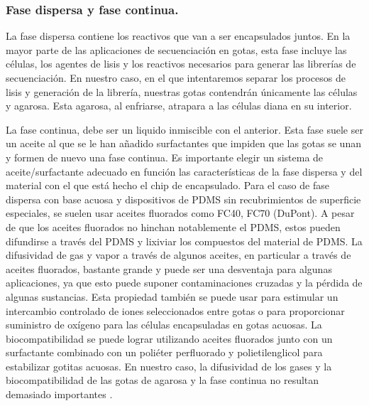 \subsubsection{Fase dispersa y fase continua.}\label{sec:antecedentes:fases}
La fase dispersa contiene los reactivos que van a ser encapsulados juntos. En la mayor parte de las aplicaciones de secuenciación en gotas, esta fase incluye las células, los agentes de lisis y los reactivos necesarios para generar las librerías de secuenciación. En nuestro caso, en el que intentaremos separar los procesos de lisis y generación de la librería, nuestras gotas contendrán únicamente las células y agarosa. Esta agarosa, al enfriarse, atrapara a las células diana en su interior.   

La fase continua, debe ser un liquido inmiscible con el anterior. Esta fase suele ser un aceite al que se le han añadido surfactantes que impiden que las gotas se unan y formen de nuevo una fase continua.  Es importante elegir un sistema de aceite/surfactante adecuado en función las características de la fase dispersa y del material con el que está hecho el chip de encapsulado.
Para el caso de fase dispersa con base acuosa y dispositivos de PDMS sin recubrimientos de superficie especiales, se suelen usar aceites fluorados como FC40, FC70 (DuPont).
A pesar de que los aceites fluorados no hinchan notablemente el PDMS, estos pueden difundirse a través del PDMS y lixiviar los compuestos del material de PDMS. La difusividad de gas y vapor a través de algunos aceites, en particular a través de aceites fluorados, bastante grande y puede ser una desventaja para algunas aplicaciones, ya que esto puede suponer contaminaciones cruzadas y la pérdida de algunas sustancias.
Esta propiedad también se puede usar para estimular un intercambio controlado de iones seleccionados entre gotas o para proporcionar suministro de oxígeno para las células encapsuladas en gotas acuosas. La biocompatibilidad se puede lograr utilizando aceites fluorados junto con un surfactante combinado con un poliéter perfluorado y polietilenglicol para estabilizar gotitas acuosas. En nuestro caso, la difusividad de los gases y la biocompatibilidad de las gotas de agarosa y la fase continua no resultan demasiado importantes \citep{article:ralf}.